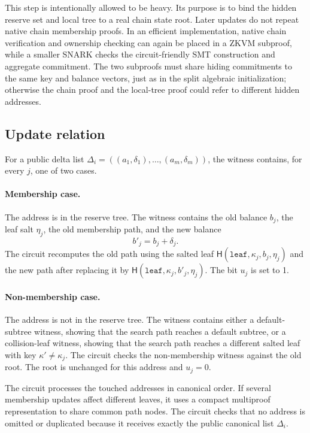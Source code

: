 \documentclass[runningheads]{llncs}
\newcommand{\CRH}{\mathsf{H}}
\newcommand{\dlist}{\Delta}
\begin{document}
This step is intentionally allowed to be heavy.  Its purpose is to bind the hidden reserve set and local tree to a real chain state root.  Later updates do not repeat native chain membership proofs.  In an efficient implementation, native chain verification and ownership checking can again be placed in a ZKVM subproof, while a smaller SNARK checks the circuit-friendly SMT construction and aggregate commitment.  The two subproofs must share hiding commitments to the same key and balance vectors, just as in the split algebraic initialization; otherwise the chain proof and the local-tree proof could refer to different hidden addresses.

\subsection{Update relation}

For a public delta list \(\dlist_i=((a_1,\delta_1),\ldots,(a_m,\delta_m))\), the witness contains, for every \(j\), one of two cases.

\paragraph{Membership case.}
The address is in the reserve tree.  The witness contains the old balance \(b_j\), the leaf salt \(\eta_j\), the old membership path, and the new balance
\[
        b'_j=b_j+\delta_j.
\]
The circuit recomputes the old path using the salted leaf \(\CRH(\mathtt{leaf},\kappa_j,b_j,\eta_j)\) and the new path after replacing it by \(\CRH(\mathtt{leaf},\kappa_j,b'_j,\eta_j)\).  The bit \(u_j\) is set to 1.

\paragraph{Non-membership case.}
The address is not in the reserve tree.  The witness contains either a default-subtree witness, showing that the search path reaches a default subtree, or a collision-leaf witness, showing that the search path reaches a different salted leaf with key \(\kappa'\ne\kappa_j\).  The circuit checks the non-membership witness against the old root.  The root is unchanged for this address and \(u_j=0\).

The circuit processes the touched addresses in canonical order.  If several membership updates affect different leaves, it uses a compact multiproof representation to share common path nodes.  The circuit checks that no address is omitted or duplicated because it receives exactly the public canonical list \(\dlist_i\).
\end{document}
